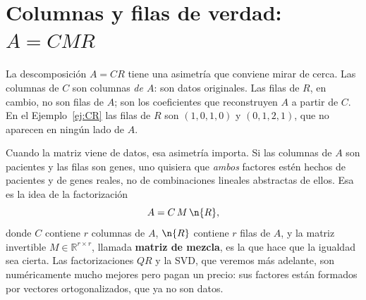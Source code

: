 \section[La factorización $A=CMR$]{Columnas y filas de verdad: $A=CMR$}
\label{sec:CMR}

La descomposición $A=CR$ tiene una asimetría que conviene mirar de cerca. Las
columnas de $C$ son columnas \emph{de $A$}: son datos originales. Las filas de
$R$, en cambio, no son filas de $A$; son los coeficientes que reconstruyen $A$ a
partir de $C$. En el Ejemplo~\ref{ej:CR} las filas de $R$ son $(1,0,1,0)$ y
$(0,1,2,1)$, que no aparecen en ningún lado de $A$.

Cuando la matriz viene de datos, esa asimetría importa. Si las columnas de $A$
son pacientes y las filas son genes, uno quisiera que \emph{ambos} factores
estén hechos de pacientes y de genes reales, no de combinaciones lineales
abstractas de ellos. Esa es la idea de la factorización
\[
A = C\,M\,\n{R},
\]
donde $C$ contiene $r$ columnas de $A$, $\n{R}$ contiene $r$ filas de $A$, y la
matriz invertible $M\in\mathbb{R}^{r\times r}$, llamada \textbf{matriz de
mezcla}, es la que hace que la igualdad sea cierta. Las factorizaciones $QR$ y
la SVD, que veremos más adelante, son numéricamente mucho mejores pero pagan un
precio: sus factores están formados por vectores ortogonalizados, que ya no son
datos.

